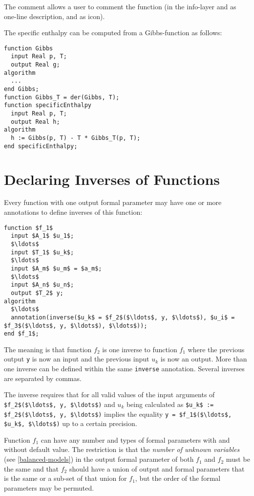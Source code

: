 The comment allows a user to comment the function (in the info-layer and as one-line description, and as icon).

\begin{example}
The specific enthalpy can be computed from a Gibbs-function as follows:
\begin{lstlisting}[language=modelica]
function Gibbs
  input Real p, T;
  output Real g;
algorithm
  ...
end Gibbs;
function Gibbs_T = der(Gibbs, T);
function specificEnthalpy
  input Real p, T;
  output Real h;
algorithm
  h := Gibbs(p, T) - T * Gibbs_T(p, T);
end specificEnthalpy;
\end{lstlisting}
\end{example}

\section{Declaring Inverses of Functions}\label{declaring-inverses-of-functions}

Every function with one output formal parameter may have one or more  annotations to define inverses of this function:
\begin{lstlisting}[language=modelica]
function $f_1$
  input $A_1$ $u_1$;
  $\ldots$
  input $T_1$ $u_k$;
  $\ldots$
  input $A_m$ $u_m$ = $a_m$;
  $\ldots$
  input $A_n$ $u_n$;
  output $T_2$ y;
algorithm
  $\ldots$
  annotation(inverse($u_k$ = $f_2$($\ldots$, y, $\ldots$), $u_i$ = $f_3$($\ldots$, y, $\ldots$), $\ldots$));
end $f_1$;
\end{lstlisting}

The meaning is that function $f_2$ is one inverse to function $f_1$ where the previous output \lstinline!y! is now an input and the previous input $u_k$ is now an output.
More than one inverse can be defined within the same \lstinline!inverse! annotation.
Several inverses are separated by commas.

\begin{nonnormative}
The inverse requires that for all valid values of the input arguments of \lstinline!$f_2$($\ldots$, y, $\ldots$)! and $u_k$ being calculated as \lstinline!$u_k$ := $f_2$($\ldots$, y, $\ldots$)! implies
the equality \lstinline!y = $f_1$($\ldots$, $u_k$, $\ldots$)! up to a certain precision.
\end{nonnormative}

Function $f_1$ can have any number and types of formal parameters with and without default value.
The restriction is that the \emph{number of unknown variables} (see \cref{balanced-models}) in the output formal parameter of both $f_1$ and $f_2$ must be the same and that $f_2$ should have a union of output and formal parameters that is the same or a sub-set of that union for $f_1$, but the order of the formal parameters may be permuted.

